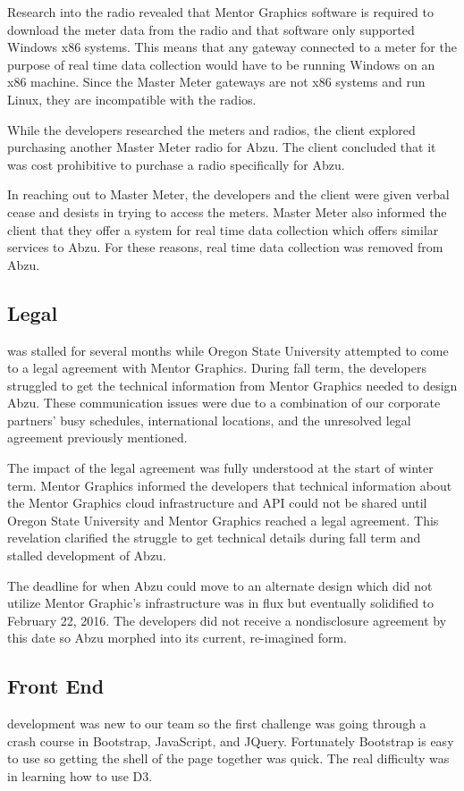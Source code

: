 \documentclass[journal]{IEEEtran}
\begin{document}
Research into the radio revealed that Mentor Graphics software is required to download the meter data from the radio and that software only supported Windows x86 systems. This means that any gateway connected to a meter for the purpose of real time data collection would have to be running Windows on an x86 machine. Since the Master Meter gateways are not x86 systems and run Linux, they are incompatible with the radios.

While the developers researched the meters and radios, the client explored purchasing another Master Meter radio for Abzu. The client concluded that it was cost prohibitive to purchase a radio specifically for Abzu.

In reaching out to Master Meter, the developers and the client were given verbal cease and desists in trying to access the meters. Master Meter also informed the client that they offer a system for real time data collection which offers similar services to Abzu. For these reasons, real time data collection was removed from Abzu.

\subsection{Legal}
 was stalled for several months while Oregon State University attempted to come to a legal agreement with Mentor Graphics. During fall term, the developers struggled to get the technical information from Mentor Graphics needed to design Abzu. These communication issues were due to a combination of our corporate partners' busy schedules, international locations, and the unresolved legal agreement previously mentioned.

The impact of the legal agreement was fully understood at the start of winter term. Mentor Graphics informed the developers that technical information about the Mentor Graphics cloud infrastructure and API could not be shared until Oregon State University and Mentor Graphics reached a legal agreement. This revelation clarified the struggle to get technical details during fall term and stalled development of Abzu.

The deadline for when Abzu could move to an alternate design which did not utilize Mentor Graphic's infrastructure was in flux but eventually solidified to February 22, 2016. The developers did not receive a nondisclosure agreement by this date so Abzu morphed into its current, re-imagined form.

\subsection{Front End}
 development was new to our team so the first challenge was going through a crash course in Bootstrap, JavaScript, and JQuery. Fortunately Bootstrap is easy to use so getting the shell of the page together was quick. The real difficulty was in learning how to use D3.
\end{document}

